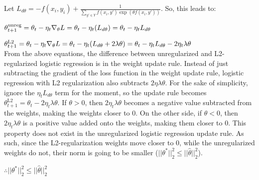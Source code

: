 \begin{solution}
	Let $L_{d\theta} = -f(x_i, y_i) + \frac{1}{\sum_{y' \in Y} f(x_i, y')\exp(\theta f(x_i, y'))}$. So, this leads to:
	
	$\theta_{t+1}^{\text{unreg}} = \theta_{t} - \eta_t\nabla_\theta L\\
	= \theta_t - \eta_t (L_{d\theta})\\
	= \theta_t - \eta_t L_{d\theta}$
	
	$\theta_{t+1}^{\text{L2}} = \theta_{t} - \eta_t\nabla_\theta L\\
	= \theta_t - \eta_t (L_{d\theta} + 2\lambda\theta)\\
	= \theta_t - \eta_t L_{d\theta} - 2\eta_t\lambda\theta$\\
	
	From the above equations, the difference between unregularized and L2-regularized logistic regression is in the weight update rule. Instead of just subtracting the gradient of the loss function in the weight update rule, logistic regression with L2 regularization also subtracts $2\eta\lambda\theta$. For the sake of simplicity, ignore the $\eta_tL_{d\theta}$ term for the moment, so the update rule becomes $\theta_{t+1}^{\text{L2}} = \theta_t - 2\eta_t\lambda\theta$. If $\theta > 0$, then $2\eta_t\lambda\theta$ becomes a negative value subtracted from the weights, making the weights closer to 0. On the other side, if $\theta < 0$, then $2\eta_t\lambda\theta$ is a positive value added onto the weights, making them closer to 0. This property does not exist in the unregularized logistic regression update rule. As such, since the L2-regularization weights move closer to 0, while the unregularized weights do not, their norm is going to be smaller ($||\theta^{*}||^{2}_{2} \leq ||\hat{\theta}||^{2}_{2}$).
	
	$\therefore ||\theta^{*}||^{2}_{2} \leq ||\hat{\theta}||^{2}_{2}$
\end{solution}